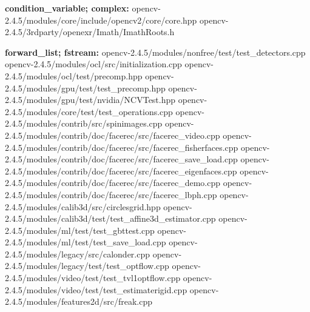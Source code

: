 \documentclass[10pt,a4paper]{article}
\begin{document}
{\bf condition\_variable; complex:} \newline
opencv-2.4.5/modules/core/include/opencv2/core/core.hpp \newline
opencv-2.4.5/3rdparty/openexr/Imath/ImathRoots.h \newline

{\bf forward\_list; fstream:} \newline
opencv-2.4.5/modules/nonfree/test/test\_detectors.cpp \newline
opencv-2.4.5/modules/ocl/src/initialization.cpp \newline
opencv-2.4.5/modules/ocl/test/precomp.hpp \newline
opencv-2.4.5/modules/gpu/test/test\_precomp.hpp \newline
opencv-2.4.5/modules/gpu/test/nvidia/NCVTest.hpp \newline
opencv-2.4.5/modules/core/test/test\_operations.cpp \newline
opencv-2.4.5/modules/contrib/src/spinimages.cpp \newline
opencv-2.4.5/modules/contrib/doc/facerec/src/facerec\_video.cpp \newline
opencv-2.4.5/modules/contrib/doc/facerec/src/facerec\_fisherfaces.cpp \newline
opencv-2.4.5/modules/contrib/doc/facerec/src/facerec\_save\_load.cpp \newline
opencv-2.4.5/modules/contrib/doc/facerec/src/facerec\_eigenfaces.cpp \newline
opencv-2.4.5/modules/contrib/doc/facerec/src/facerec\_demo.cpp \newline
opencv-2.4.5/modules/contrib/doc/facerec/src/facerec\_lbph.cpp \newline
opencv-2.4.5/modules/calib3d/src/circlesgrid.hpp \newline
opencv-2.4.5/modules/calib3d/test/test\_affine3d\_estimator.cpp \newline
opencv-2.4.5/modules/ml/test/test\_gbttest.cpp \newline
opencv-2.4.5/modules/ml/test/test\_save\_load.cpp \newline
opencv-2.4.5/modules/legacy/src/calonder.cpp \newline
opencv-2.4.5/modules/legacy/test/test\_optflow.cpp \newline
opencv-2.4.5/modules/video/test/test\_tvl1optflow.cpp \newline
opencv-2.4.5/modules/video/test/test\_estimaterigid.cpp \newline
opencv-2.4.5/modules/features2d/src/freak.cpp \newline
\end{document}
